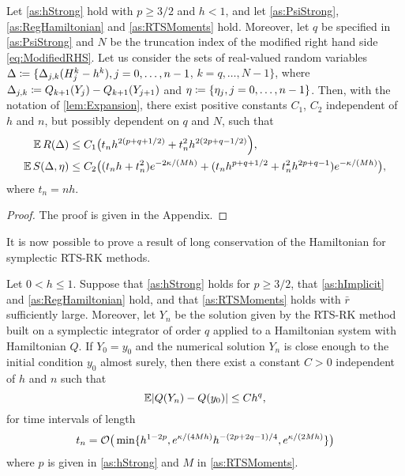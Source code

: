 \documentclass[10pt]{article}
\begin{document}
\begin{lemma}\label{lem:Remainder} Let \cref{as:hStrong} hold with $p \geq 3/2$ and $h < 1$, and let \cref{as:PsiStrong}, \cref{as:RegHamiltonian} and \cref{as:RTSMoments} hold. {Moreover, let $q$ be specified in \cref{as:PsiStrong} and $N$ be the truncation index of the modified right hand side \eqref{eq:ModifiedRHS}}. Let us consider the sets of real-valued random variables $\Delta \coloneqq \{\Delta_{j,k}(H_j^k - h^k), j = 0, \ldots, n-1$, $k = q, \ldots, N-1\}$, where $\Delta_{j,k} \coloneqq  Q_{k+1}(Y_j) - Q_{k+1}(Y_{j+1})$ and $\eta \coloneqq \{\eta_j, j = 0, \ldots, n-1\}$.  Then, with the notation of \cref{lem:Expansion}, there exist positive constants $C_1$, $C_2$ independent of $h$ and $n$, but possibly dependent on $q$ and $N$, such that
	\begin{equation}
	\begin{aligned}
		\operatorname{\mathbb{E}} R(\Delta) &\leq C_1 \big(t_n h^{2(p + q + 1/2)} + t_n^2 h^{2(2p + q - 1/2)}\Big),\\
		\operatorname{\mathbb{E}} S(\Delta, \eta) &\leq C_2 \big( (t_n h + t_n^2) e^{-2\kappa/(Mh)} + (t_n h^{p+q+1/2} + t_n^2 h^{2p+q-1})e^{-\kappa/(Mh)}\big),
	\end{aligned}
	\end{equation}
	where $t_n = nh$.
\end{lemma}
\begin{proof} The proof is given in the Appendix. \end{proof}
It is now possible to prove a result of long conservation of the Hamiltonian for symplectic RTS-RK methods.
\begin{theorem}\label{thm:RTSHamiltonian} Let $0 < h \leq 1$. {Suppose that \cref{as:hStrong} holds for $p \geq 3/2$, that \cref{as:hImplicit} and \cref{as:RegHamiltonian} hold, and that \cref{as:RTSMoments} holds with $\bar r$ sufficiently large. Moreover, let $Y_n$ be the solution given by the RTS-RK method built on a symplectic integrator of order $q$ applied to a Hamiltonian system with Hamiltonian $Q$. If $Y_0 = y_0$ and the numerical solution $Y_n$ is close enough to the initial condition $y_0$ almost surely, then there exist a constant $C > 0$ independent of $h$ and $n$ such that}
		\begin{equation}
		\operatorname{\mathbb{E}} \lvert Q(Y_n) - Q(y_0)\rvert \leq C h^q,
		\end{equation}
		for time intervals of length 
		\begin{equation}
		t_n = \mathcal{O}\big(\min\{h^{1-2p}, e^{\kappa/(4Mh)} h^{-(2p+2q-1)/4}, e^{\kappa/(2Mh)}\}\big)
		\end{equation}
		where $p$ is given in \cref{as:hStrong} and $M$ in \cref{as:RTSMoments}.
\end{theorem}
\end{document}
